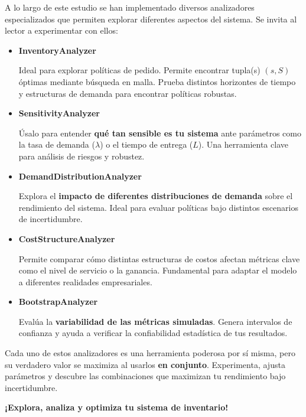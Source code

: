 \documentclass[12pt,a4paper]{article}
\begin{document}
A lo largo de este estudio se han implementado diversos analizadores especializados que permiten explorar diferentes aspectos del sistema. Se invita al lector a experimentar con ellos:

\begin{itemize}
    \item \textbf{InventoryAnalyzer} %
    
    Ideal para explorar políticas de pedido. Permite encontrar tupla(s) $(s, S)$ óptimas mediante búsqueda en malla. Prueba distintos horizontes de tiempo y estructuras de demanda para encontrar políticas robustas.

    \item \textbf{SensitivityAnalyzer} %
    
    Úsalo para entender \textbf{qué tan sensible es tu sistema} ante parámetros como la tasa de demanda ($\lambda$) o el tiempo de entrega ($L$). Una herramienta clave para análisis de riesgos y robustez.

    \item \textbf{DemandDistributionAnalyzer} %
    
    Explora el \textbf{impacto de diferentes distribuciones de demanda} sobre el rendimiento del sistema. Ideal para evaluar políticas bajo distintos escenarios de incertidumbre.

    \item \textbf{CostStructureAnalyzer} %
    
    Permite comparar cómo distintas estructuras de costos afectan métricas clave como el nivel de servicio o la ganancia. Fundamental para adaptar el modelo a diferentes realidades empresariales.

    \item \textbf{BootstrapAnalyzer} %
    
    Evalúa la \textbf{variabilidad de las métricas simuladas}. Genera intervalos de confianza y ayuda a verificar la confiabilidad estadística de tus resultados.
\end{itemize}

\vspace{1em}

Cada uno de estos analizadores es una herramienta poderosa por sí misma, pero su verdadero valor se maximiza al usarlos \textbf{en conjunto}. Experimenta, ajusta parámetros y descubre las combinaciones que maximizan tu rendimiento bajo incertidumbre.

\begin{center}
\textbf{\Large ¡Explora, analiza y optimiza tu sistema de inventario!} %
\end{center}
\end{document}
